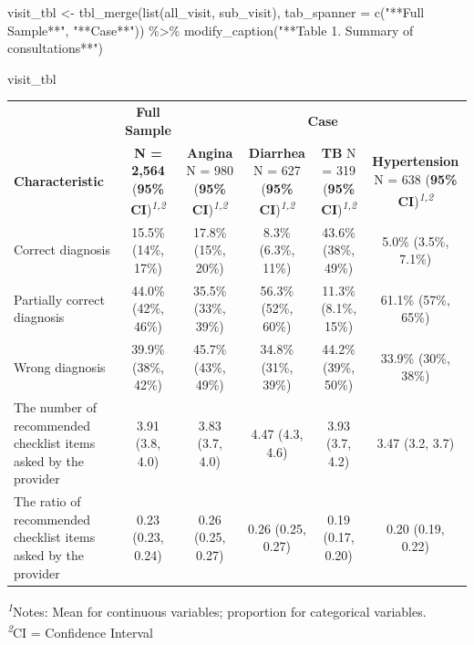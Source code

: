 \documentclass[
  letterpaper,
  DIV=11,
  numbers=noendperiod]{scrartcl}
\newenvironment{Shaded}{\begin{snugshade}}{\end{snugshade}}
\newcommand{\AttributeTok}[1]{\textcolor[rgb]{0.40,0.45,0.13}{#1}}
\newcommand{\FunctionTok}[1]{\textcolor[rgb]{0.28,0.35,0.67}{#1}}
\newcommand{\NormalTok}[1]{\textcolor[rgb]{0.00,0.23,0.31}{#1}}
\newcommand{\OtherTok}[1]{\textcolor[rgb]{0.00,0.23,0.31}{#1}}
\newcommand{\SpecialCharTok}[1]{\textcolor[rgb]{0.37,0.37,0.37}{#1}}
\newcommand{\StringTok}[1]{\textcolor[rgb]{0.13,0.47,0.30}{#1}}
\begin{document}
\begin{Shaded}
\begin{Highlighting}[]
\NormalTok{visit\_tbl }\OtherTok{\textless{}{-}} \FunctionTok{tbl\_merge}\NormalTok{(}\FunctionTok{list}\NormalTok{(all\_visit, sub\_visit), }\AttributeTok{tab\_spanner =} \FunctionTok{c}\NormalTok{(}\StringTok{"**Full Sample**"}\NormalTok{, }\StringTok{"**Case**"}\NormalTok{)) }\SpecialCharTok{\%\textgreater{}\%} \FunctionTok{modify\_caption}\NormalTok{(}\StringTok{"**Table 1. Summary of consultations**"}\NormalTok{)}

\NormalTok{visit\_tbl}
\end{Highlighting}
\end{Shaded}

\begin{table}
\fontsize{12.0pt}{14.4pt}\selectfont
\begin{tabular*}{\linewidth}{@{\extracolsep{\fill}}lccccc}
\toprule
 & \textbf{Full Sample} & \multicolumn{4}{c}{\textbf{Case}} \\ 
\cmidrule(lr){2-2} \cmidrule(lr){3-6}
\textbf{Characteristic} & \textbf{N = 2,564} (\textbf{95\% CI})\textsuperscript{\textit{1,2}} & \textbf{Angina}  N = 980 (\textbf{95\% CI})\textsuperscript{\textit{1,2}} & \textbf{Diarrhea}  N = 627 (\textbf{95\% CI})\textsuperscript{\textit{1,2}} & \textbf{TB}  N = 319 (\textbf{95\% CI})\textsuperscript{\textit{1,2}} & \textbf{Hypertension}  N = 638 (\textbf{95\% CI})\textsuperscript{\textit{1,2}} \\ 
\midrule\addlinespace[2.5pt]
Correct diagnosis & 15.5\% (14\%, 17\%) & 17.8\% (15\%, 20\%) & 8.3\% (6.3\%, 11\%) & 43.6\% (38\%, 49\%) & 5.0\% (3.5\%, 7.1\%) \\ 
Partially correct diagnosis & 44.0\% (42\%, 46\%) & 35.5\% (33\%, 39\%) & 56.3\% (52\%, 60\%) & 11.3\% (8.1\%, 15\%) & 61.1\% (57\%, 65\%) \\ 
Wrong diagnosis & 39.9\% (38\%, 42\%) & 45.7\% (43\%, 49\%) & 34.8\% (31\%, 39\%) & 44.2\% (39\%, 50\%) & 33.9\% (30\%, 38\%) \\ 
The number of recommended checklist items asked by the provider & 3.91 (3.8, 4.0) & 3.83 (3.7, 4.0) & 4.47 (4.3, 4.6) & 3.93 (3.7, 4.2) & 3.47 (3.2, 3.7) \\ 
The ratio of recommended checklist items asked by the provider & 0.23 (0.23, 0.24) & 0.26 (0.25, 0.27) & 0.26 (0.25, 0.27) & 0.19 (0.17, 0.20) & 0.20 (0.19, 0.22) \\ 
\bottomrule
\end{tabular*}
\begin{minipage}{\linewidth}
\textsuperscript{\textit{1}}Notes: Mean for continuous variables; proportion for categorical variables.\\
\textsuperscript{\textit{2}}CI = Confidence Interval\\
\end{minipage}
\end{table}
\end{document}
